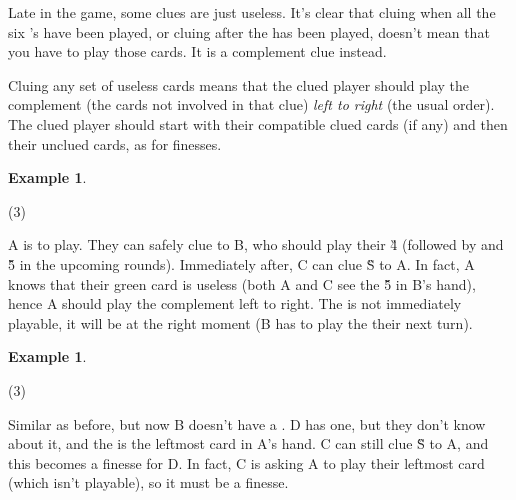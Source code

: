 \documentclass[a4paper]{article}
\theoremstyle{plain}
\theoremstyle{definition}
\newtheorem{example}[theorem]{Example}
\begin{document}
Late in the game, some clues are just useless. It's clear that cluing  when all the six 's have been played, or cluing  after the  has been played, doesn't mean that you have to play those cards. It is a complement clue instead.

Cluing any set of useless cards means that the clued player should play the complement (the cards not involved in that clue) \textit{left to right} (the usual order). The clued player should start with their compatible clued cards (if any) and then their unclued cards, as for finesses.

\begin{example}
	\hfill
	\begin{tasks}(3)
		\task[+]      
		\task[A]    
		\task[B]    
		\task[C]    
		\task[D]    
		\task[E]    
	\end{tasks}
	
	A is to play. They can safely clue  to B, who should play their \G{4} (followed by  and \G{5} in the upcoming rounds). Immediately after, C can clue \G{S} to A. In fact, A knows that their green card is useless (both A and C see the \G{5} in B's hand), hence A should play the complement left to right. The  is not immediately playable, it will be at the right moment (B has to play the  their next turn).
\end{example}

\begin{example}
	\hfill
	\begin{tasks}(3)
		\task[+]      
		\task[A]    
		\task[B]    
		\task[C]    
		\task[D]    
		\task[E]    
	\end{tasks}
	
	Similar as before, but now B doesn't have a . D has one, but they don't know about it, and the  is the leftmost card in A's hand. C can still clue \G{S} to A, and this becomes a finesse for D. In fact, C is asking A to play their leftmost card (which isn't playable), so it must be a finesse.
\end{example}

%	
\end{document}
